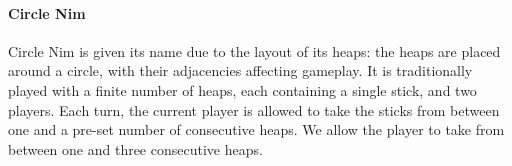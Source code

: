 \documentclass[conference]{IEEEtran}
\begin{document}


\paragraph{Circle Nim}
Circle Nim is given its name due to the layout of its heaps: the heaps are placed around a circle, with their adjacencies affecting gameplay. It is traditionally played with a finite number of heaps, each containing a single stick, and two players. Each turn, the current player is allowed to take the sticks from between one and a pre-set number of consecutive heaps. We allow the player to take from between one and three consecutive heaps. 
\end{document}
